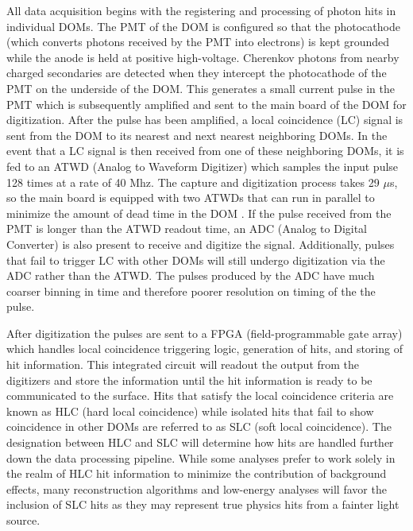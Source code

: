 \documentclass{gatech-thesis}
\begin{document}
All data acquisition begins with the registering and processing of photon hits in individual DOMs. The PMT of the DOM is configured so that the photocathode (which converts photons received by the PMT into electrons) is kept grounded while the anode is held at positive high-voltage.  Cherenkov photons from nearby charged secondaries are detected when they intercept the photocathode of the PMT on the underside of the DOM. This generates a small current pulse in the PMT which is subsequently amplified and sent to the main board of the DOM for digitization. After the pulse has been amplified, a local coincidence (LC) signal is sent from the DOM to its nearest and next nearest neighboring DOMs. In the event that a LC signal is then received from one of these neighboring DOMs, it is fed to an ATWD (Analog to Waveform Digitizer) which samples the input pulse 128 times at a rate of 40 Mhz. The capture and digitization process takes 29 $\mu$s, so the main board is equipped with two ATWDs that can run in parallel to minimize the amount of dead time in the DOM \cite{2009NIMPA.601..294A}. If the pulse received from the PMT is longer than the ATWD readout time, an ADC (Analog to Digital Converter) is also present to receive and digitize the signal. Additionally, pulses that fail to trigger LC with other DOMs will still undergo digitization via the ADC rather than the ATWD. The pulses produced by the ADC have much coarser binning in time and therefore poorer resolution on timing of the the pulse.

After digitization the pulses are sent to a FPGA (field-programmable gate array) which handles local coincidence triggering logic, generation of hits, and storing of hit information. This integrated circuit will readout the output from the digitizers and store the information until the hit information is ready to be communicated to the surface. Hits that satisfy the local coincidence criteria are known as HLC (hard local coincidence) while isolated hits that fail to show coincidence in other DOMs are referred to as SLC (soft local coincidence). The designation between HLC and SLC will determine how hits are handled further down the data processing pipeline. While some analyses prefer to work solely in the realm of HLC hit information to minimize the contribution of background effects, many reconstruction algorithms and low-energy analyses will favor the inclusion of SLC hits as they may represent true physics hits from a fainter light source.
\end{document}

